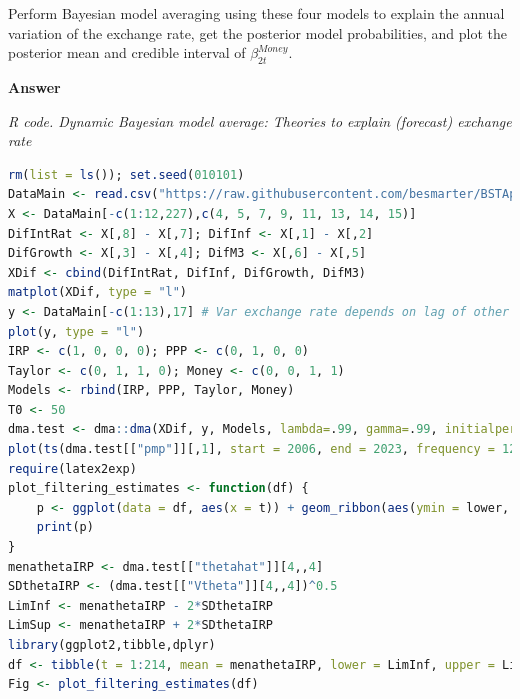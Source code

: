 \begin{enumerate}[leftmargin=*]
Perform Bayesian model averaging using these four models to explain the annual variation of the exchange rate, get the posterior model probabilities, and plot the posterior mean and credible interval of $\beta_{2t}^{Money}$.  

\textbf{Answer}


\begin{tcolorbox}[enhanced,width=4.67in,center upper,
	fontupper=\large\bfseries,drop shadow southwest,sharp corners]
	\textit{R code. Dynamic Bayesian model average: Theories to explain (forecast) exchange rate}
	\begin{VF}
		\begin{lstlisting}[language=R]
rm(list = ls()); set.seed(010101)
DataMain <- read.csv("https://raw.githubusercontent.com/besmarter/BSTApp/refs/heads/master/DataApp/19ExchangeRateCOPUSD.csv", sep = ",", header = TRUE, quote = "")
X <- DataMain[-c(1:12,227),c(4, 5, 7, 9, 11, 13, 14, 15)]
DifIntRat <- X[,8] - X[,7]; DifInf <- X[,1] - X[,2]
DifGrowth <- X[,3] - X[,4]; DifM3 <- X[,6] - X[,5]
XDif <- cbind(DifIntRat, DifInf, DifGrowth, DifM3)
matplot(XDif, type = "l")
y <- DataMain[-c(1:13),17] # Var exchange rate depends on lag of other variables
plot(y, type = "l")
IRP <- c(1, 0, 0, 0); PPP <- c(0, 1, 0, 0)
Taylor <- c(0, 1, 1, 0); Money <- c(0, 0, 1, 1)
Models <- rbind(IRP, PPP, Taylor, Money)
T0 <- 50
dma.test <- dma::dma(XDif, y, Models, lambda=.99, gamma=.99, initialperiod = T0)
plot(ts(dma.test[["pmp"]][,1], start = 2006, end = 2023, frequency = 12), type = "l", main = "Exchange rate models", ylab = "Posterior model probability", ylim = c(0,1)) lines(ts(dma.test[["pmp"]][,2], start = 2006, end = 2023, frequency = 12), col = "red") lines(ts(dma.test[["pmp"]][,3], start = 2006, end = 2023, frequency = 12), col = "green") lines(ts(dma.test[["pmp"]][,4], start = 2006, end = 2023, frequency = 12), col = "blue") legend(x = 2009, y = 0.6, legend = c("IRP", "PPP", "Taylor rule", "Money supply"), col = c("black", "red", "green", "blue"), lty=1:1, cex=0.8)
require(latex2exp)
plot_filtering_estimates <- function(df) {
	p <- ggplot(data = df, aes(x = t)) + geom_ribbon(aes(ymin = lower, ymax = upper), alpha = 0.5, fill = "blue") + geom_line(aes(y = mean), colour = "black", linewidth = 0.8) + geom_hline(yintercept=0, colour = "red") + ylab(TeX("$\\beta_{Growth_t}^{Money}$")) + xlab("Time") 
	print(p)
}
menathetaIRP <- dma.test[["thetahat"]][4,,4]
SDthetaIRP <- (dma.test[["Vtheta"]][4,,4])^0.5
LimInf <- menathetaIRP - 2*SDthetaIRP
LimSup <- menathetaIRP + 2*SDthetaIRP
library(ggplot2,tibble,dplyr)
df <- tibble(t = 1:214, mean = menathetaIRP, lower = LimInf, upper = LimSup)
Fig <- plot_filtering_estimates(df)
\end{lstlisting}
	\end{VF}
\end{tcolorbox} 


\end{enumerate}
